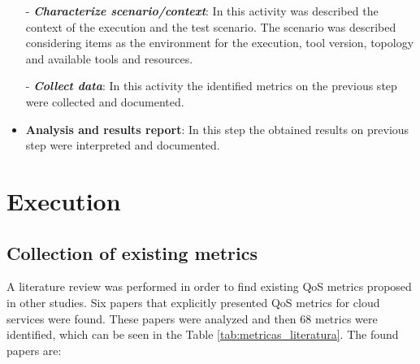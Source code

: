 \documentclass[conference]{IEEEtran}
\begin{document}
\begin{itemize}

  \subitem - \emph{\textbf{Characterize scenario/context}}: In this activity was described the context of the execution and the test scenario. The scenario was described considering items as the environment for
  the execution, tool version, topology and available tools and resources.

  \subitem - \emph{\textbf{Collect data}}: In this activity the identified metrics on 
  the previous step were collected and documented.

 \item \textbf{Analysis and results report}: In this step the obtained results on previous step were
 interpreted and documented.
 
\end{itemize}

\section{Execution} %

  \subsection{Collection of existing metrics}
     
      
      A literature review was performed in order to find existing QoS metrics proposed in other studies.
      Six papers that explicitly presented QoS metrics for cloud services were found. These papers were analyzed and then 
      68 metrics were identified, which can be seen in the Table \ref{tab:metricas_literatura}. The found papers are:
      
\end{document}
